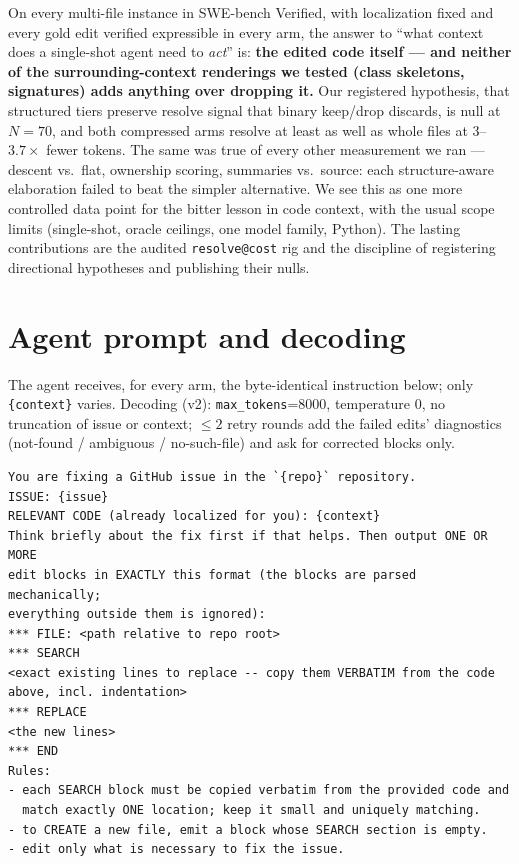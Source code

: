 \documentclass{article}
\makeatletter
\newcommand{\resolveatcost}{\texttt{resolve@cost}}
\makeatother
\begin{document}
On every multi-file instance in SWE-bench Verified, with localization fixed and every gold edit
verified expressible in every arm, the answer to ``what context does a single-shot agent need to
\emph{act}'' is: \textbf{the edited code itself --- and neither of the surrounding-context
renderings we tested (class skeletons, signatures) adds anything over dropping it.} Our registered
hypothesis, that structured tiers preserve resolve signal that binary keep/drop discards, is null
at $N{=}70$, and both compressed arms resolve at least as well as whole files at $3$--$3.7\times$
fewer tokens. The same was true of every other measurement we ran --- descent vs.\ flat,
ownership scoring, summaries vs.\ source: each structure-aware elaboration failed to beat the
simpler alternative. We see this as one more controlled data point for the bitter lesson in code
context, with the usual scope limits (single-shot, oracle ceilings, one model family, Python). The
lasting contributions are the audited \resolveatcost{} rig and the discipline of registering
directional hypotheses and publishing their nulls.




\appendix

\section{Agent prompt and decoding}
\label{app:prompt}

The agent receives, for every arm, the byte-identical instruction below; only \texttt{\{context\}}
varies. Decoding (v2): \texttt{max\_tokens}=8000, temperature 0, no truncation of issue or
context; $\leq 2$ retry rounds add the failed edits' diagnostics (not-found / ambiguous /
no-such-file) and ask for corrected blocks only.

\begin{small}
\begin{verbatim}
You are fixing a GitHub issue in the `{repo}` repository.
ISSUE: {issue}
RELEVANT CODE (already localized for you): {context}
Think briefly about the fix first if that helps. Then output ONE OR MORE
edit blocks in EXACTLY this format (the blocks are parsed mechanically;
everything outside them is ignored):
*** FILE: <path relative to repo root>
*** SEARCH
<exact existing lines to replace -- copy them VERBATIM from the code
above, incl. indentation>
*** REPLACE
<the new lines>
*** END
Rules:
- each SEARCH block must be copied verbatim from the provided code and
  match exactly ONE location; keep it small and uniquely matching.
- to CREATE a new file, emit a block whose SEARCH section is empty.
- edit only what is necessary to fix the issue.
\end{verbatim}
\end{small}
\end{document}
